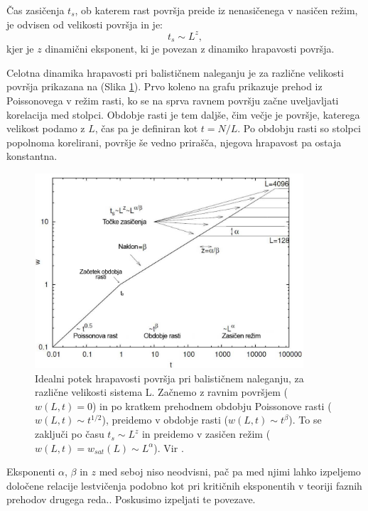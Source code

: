 \documentclass[a4paper, twoside, 12pt]{book}
\begin{document}
Čas zasičenja $t_s$, ob katerem rast površja preide iz nenasičenega v nasičen režim, je odvisen od velikosti površja in je:
  \begin{equation}
    t_s \sim L^z,
    \label{z}
  \end{equation}
kjer je $z$ dinamični eksponent, ki je povezan z dinamiko hrapavosti površja.

Celotna dinamika hrapavosti pri balističnem naleganju je za različne velikosti površja prikazana na (Slika \ref{fig:barabasi}). Prvo koleno na grafu prikazuje prehod iz Poissonovega v režim rasti, ko se na sprva ravnem površju začne uveljavljati korelacija med stolpci. Obdobje rasti je tem daljše, čim večje je površje, katerega velikost podamo z $L$, čas pa je definiran kot $t=N/L$. Po obdobju rasti so stolpci popolnoma korelirani, površje še vedno prirašča, njegova hrapavost pa ostaja konstantna.

    \begin{figure}[h]
      \begin{center}
        \includegraphics[width=10cm]{slike/bdep3.pdf}
      \end{center}
      \caption{Idealni potek hrapavosti površja pri balističnem naleganju, za različne velikosti sistema L. Začnemo z ravnim površjem ($w(L,t)=0$) in po kratkem prehodnem obdobju Poissonove rasti ($w(L,t) \sim t^{1/2}$), preidemo v obdobje rasti ($w(L,t) \sim t^{\beta}$). To se zaključi po času $t_s \sim L^z$ in preidemo v zasičen režim ($w(L,t) = w_{sat}(L) \sim L^{\alpha}$). Vir \cite{schwettmann2003}.}
      \label{fig:barabasi}
    \end{figure}

Eksponenti $\alpha$, $\beta$ in $z$ med seboj niso neodvisni, pač pa med njimi lahko izpeljemo določene relacije lestvičenja podobno kot pri kritičnih eksponentih v teoriji faznih prehodov drugega reda.\cite{stanley1987introduction}. Poskusimo izpeljati te povezave.
\end{document}
